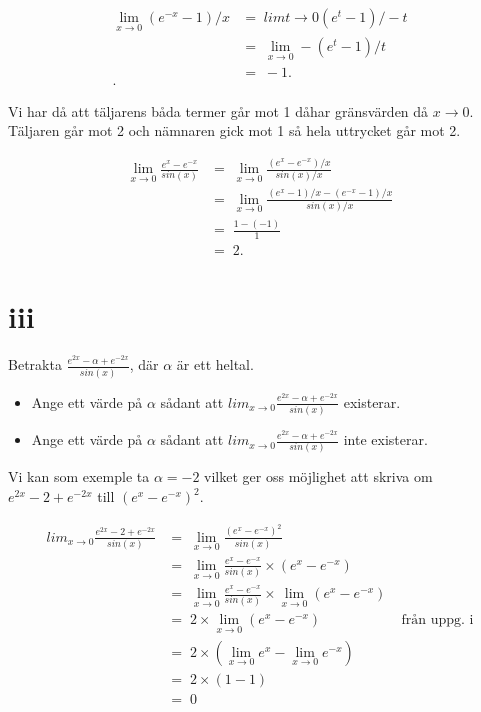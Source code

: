 \documentclass[a4paper, 11pt]{article}
\begin{document}
\begin{align*}
    \lim\limits_{x\to 0}  (e^{-x} - 1)/ x &=\;  lim{t \rightarrow 0} (e^{t} - 1)/ -t \\
                                        &=\;    \lim\limits_{x\to 0}  - (e^{t} - 1)/ t \\
                                        &=\; -1.\\.
\end{align*}

Vi har då att täljarens båda termer går mot 1 dåhar gränsvärden då $x \rightarrow 0$. 
Täljaren går mot 2 och nämnaren gick mot 1 så hela
uttrycket går mot 2.

\begin{align*}
  \lim\limits_{x\to 0}  \frac{e^x - e^{-x}}{sin(x)} &=\;  \lim\limits_{x\to 0}  \frac{(e^x - e^{-x})/ x }{sin(x)/ x} \\
                                                  &=\;  \lim\limits_{x\to 0}  \frac{(e^x - 1)/x - (e^{-x} -1)/ x}{sin(x)/ x} \\
                                                  &=\; \frac{1 - (-1)}{1} \\
  &=\; 2.
\end{align*}



\section*{iii}

Betrakta $\frac{e^{2x} - \alpha + e^{-2x}}{sin(x)}$, där $\alpha$ är ett heltal.
\begin{itemize}
\item Ange ett värde på $\alpha$ sådant att $lim_{x \rightarrow 0}\frac{e^{2x} - \alpha + e^{-2x}}{sin(x)}$ existerar. 
\item Ange ett värde på $\alpha$ sådant att $lim_{x \rightarrow 0}\frac{e^{2x} - \alpha + e^{-2x}}{sin(x)}$ inte existerar. 
\end{itemize}

Vi kan som exemple ta $\alpha = -2$ vilket ger oss möjlighet att
skriva om $e^{2x} -2 + e^{-2x}$ till $(e^x - e^{-x})^2$. 

\begin{align*}
  lim_{x \rightarrow 0}\frac{e^{2x} -2 + e^{-2x}}{sin(x)} 
      &=\; \lim_{x \rightarrow 0}\frac{(e^x - e^{-x})^2}{sin(x)} \\
      &=\; \lim_{x \rightarrow 0}\frac{e^x - e^{-x}}{sin(x)} \times (e^x - e^{-x}) \\
      &=\; \lim_{x \rightarrow 0}\frac{e^x - e^{-x}}{sin(x)} \times \lim_{x \rightarrow 0}(e^x - e^{-x}) \\
      &=\; 2 \times \lim_{x \rightarrow 0}(e^x - e^{-x}) &\; \text{från uppg. i}\\   
      &=\; 2 \times (\lim_{x \rightarrow 0}e^x - \lim_{x \rightarrow 0}   e^{-x}) \\  
      &=\; 2 \times (1 - 1) \\
      &=\; 0
\end{align*}
\end{document}
